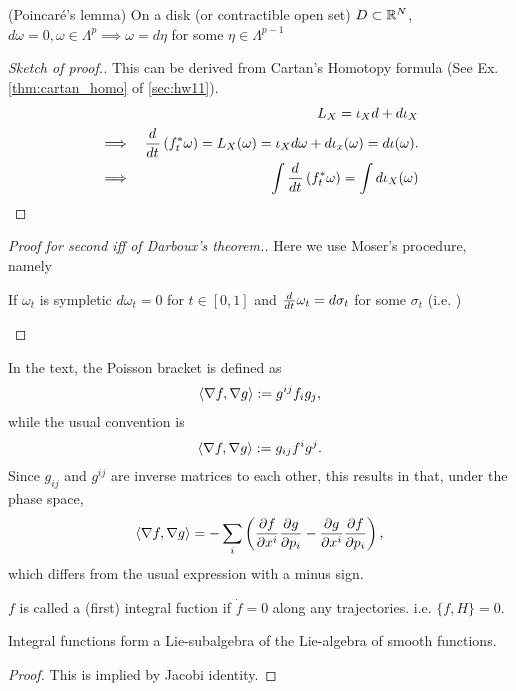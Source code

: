\begin{lemma}
	(Poincar\'{e}'s lemma) On a disk (or contractible open set) $D \subset \mathbb{R}^N$, $d\omega = 0, \omega \in \Lambda^{p} \implies \omega = d\eta$ for some $\eta \in \Lambda^{p-1}$
	\label{lem:poincare}
\end{lemma}
\begin{proof}[Sketch of proof.]
	This can be derived from Cartan's Homotopy formula (See Ex. \ref{thm:cartan_homo} of  \ref{sec:hw11}).
	\begin{eqnarray}
		&&L_{X} = \iota_X d + d \iota_X
		\nonumber\\
		\implies &&\frac{d^{}  }{d t^{}} \left(f^*_t \omega\right)  = L_X(\omega) = \iota_X d\omega + d\iota_x(\omega) = d\iota(\omega).
		\nonumber\\
		\implies && \int \frac{d^{}  }{d t^{}} \left(f^*_t \omega\right) = \int d \iota_X(\omega)
	\end{eqnarray}
\end{proof}

\begin{proof}[Proof for second iff of Darboux's theorem.]
	Here we use Moser's procedure, namely
	\begin{lemma}
		If $\omega_t$ is sympletic $d\omega_t = 0$ for $t \in [0, 1]$ and $\frac{d^{}  }{d t^{}}\omega_t = d\sigma_t$ for some $\sigma_t$ (i.e. )
	\end{lemma}
\end{proof}


\begin{remark}
	In the text, the Poisson bracket is defined as 
	\begin{eqnarray}
		\left< \nabla f, \nabla g \right> := g^{ij} f_i g_j,
	\end{eqnarray}
	while the usual convention is
	\begin{eqnarray}
		\left< \nabla f, \nabla g \right> := g_{ij} f^i g^j.
	\end{eqnarray}
	Since $g_{ij}$ and $g^{ij}$ are inverse matrices to each other, this results in that, under the phase space, 
	\[ \left< \nabla f, \nabla g \right> = - \sum_i \left( \frac{ \partial f}{ \partial x^i } \frac{ \partial g}{ \partial p_i } - \frac{ \partial g}{ \partial x^i } \frac{ \partial f}{ \partial p_i } \right), \]
	which differs from the usual expression with a minus sign.
\end{remark}

\begin{definition}
	$f$ is called a (first) integral fuction if $\dot{f} = 0$ along any trajectories. i.e. $\{f, H\} = 0$.
\end{definition}
\begin{corollary}
	Integral functions form a Lie-subalgebra of the Lie-algebra of smooth functions.
\end{corollary}
\begin{proof}
	This is implied by Jacobi identity.
\end{proof}

